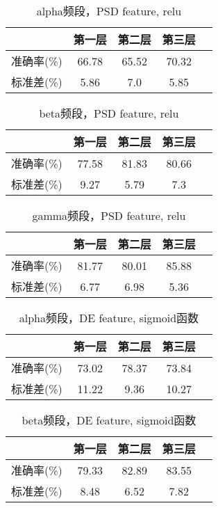 		\begin{table}[!h]
	\centering
\begin{tabular}{|c|c|c|c|c|}
\hline
\hline
  & 第一层 & 第二层 & 第三层 \\
\hline
准确率(\%) & 66.78 & 65.52 & 70.32\\
\hline
标准差(\%) & 5.86 & 7.0 & 5.85 \\
\hline
\end{tabular}
\caption{alpha频段，PSD feature, relu}
\end{table} 

		\begin{table}[!h]
	\centering
\begin{tabular}{|c|c|c|c|c|}
\hline
\hline
  & 第一层 & 第二层 & 第三层 \\
\hline
准确率(\%) & 77.58 & 81.83 & 80.66\\
\hline
标准差(\%) & 9.27 & 5.79 & 7.3 \\
\hline
\end{tabular}
\caption{beta频段，PSD feature, relu}
\end{table} 

		\begin{table}[!h]
	\centering
\begin{tabular}{|c|c|c|c|c|}
\hline
\hline
  & 第一层 & 第二层 & 第三层 \\
\hline
准确率(\%) & 81.77 & 80.01 & 85.88 \\
\hline
标准差(\%) & 6.77 & 6.98 & 5.36 \\
\hline
\end{tabular}
\caption{gamma频段，PSD feature, relu}
\end{table} 

		\begin{table}[!h]
	\centering
\begin{tabular}{|c|c|c|c|c|}
\hline
\hline
  & 第一层 & 第二层 & 第三层 \\
\hline
准确率(\%) & 73.02 & 78.37 & 73.84\\
\hline
标准差(\%) & 11.22 & 9.36 & 10.27\\
\hline
\end{tabular}
\caption{alpha频段，DE feature, sigmoid函数}
\end{table} 

		\begin{table}[!h]
	\centering
\begin{tabular}{|c|c|c|c|c|}
\hline
\hline
  & 第一层 & 第二层 & 第三层 \\
\hline
准确率(\%) & 79.33 & 82.89 &83.55\\
\hline
标准差(\%) & 8.48 & 6.52 & 7.82 \\
\hline
\end{tabular}
\caption{beta频段，DE feature, sigmoid函数}
\end{table} 

